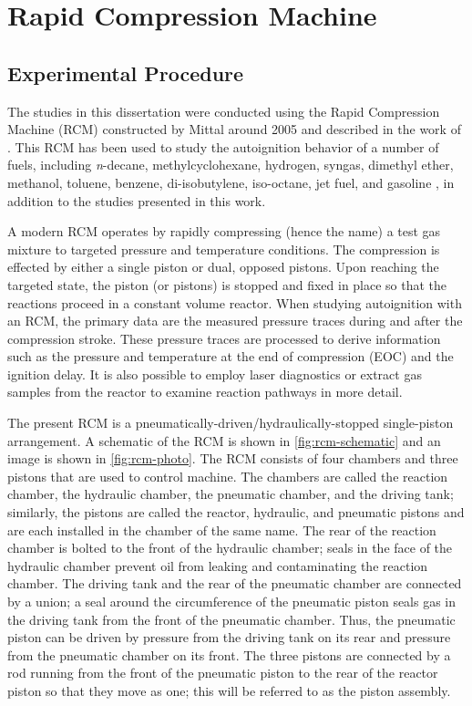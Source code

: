 \documentclass[../main.tex]{subfiles}
\begin{document}
\section{Rapid Compression Machine}
\label{sec:rcm}
\subsection{Experimental Procedure}
The studies in this dissertation were conducted using the Rapid
Compression Machine (RCM) constructed by Mittal around 2005 and described in the
work of \textcite{Mittal2007,Mittal2006a}. This RCM has been used to
study the autoignition behavior of a number of fuels, including
\textit{n}-decane, methylcyclohexane, hydrogen, syngas,
dimethyl ether, methanol, toluene, benzene, di-isobutylene, iso-octane,
jet fuel, and gasoline \cite{Kumar2009, Mittal2009, Das2012a, Mittal2006,
Das2012, Mittal2008a, Kumar2011a, Mittal2007a, Mittal2008, Kumar2010,
Dooley2010, Dooley2012, Hui2012a, Keromnes2013, Kukkadapu2013, Kukkadapu2012a},
in addition to the studies presented in this work.

A modern RCM operates by rapidly compressing (hence the name) a test gas
mixture to targeted pressure and temperature conditions. The compression
is effected by either a single piston or dual, opposed pistons. Upon
reaching the targeted state, the piston (or pistons) is stopped and
fixed in place so that the reactions proceed in a constant volume
reactor. When studying autoignition with an RCM, the primary data are
the measured pressure traces during and after the compression stroke.
These pressure traces are processed to derive information such as the
pressure and temperature at the end of compression (EOC) and the
ignition delay. It is also possible to employ laser diagnostics or
extract gas samples from the reactor to examine reaction pathways in
more detail.

The present RCM is a pneumatically-driven/hydraulically-stopped
single-piston arrangement. A schematic of the RCM is shown in
\autoref{fig:rcm-schematic} and an image is shown in \autoref{fig:rcm-photo}.
The RCM consists of four chambers and
three pistons that are used to control machine. The chambers are
called the reaction chamber, the hydraulic chamber, the pneumatic
chamber, and the driving tank; similarly, the pistons are called
the reactor, hydraulic, and pneumatic pistons and are each installed
in the chamber of the same name. The rear of the reaction chamber
is bolted to the front of the hydraulic chamber; seals in the face
of the hydraulic chamber prevent oil from leaking and contaminating
the reaction chamber. The driving tank and the rear of the pneumatic
chamber are connected by a union; a seal around the circumference of
the pneumatic piston seals gas in the driving tank from the front of
the pneumatic chamber. Thus, the pneumatic piston can be driven by
pressure from the driving tank on its rear and pressure from the
pneumatic chamber on its front. The three pistons are connected by
a rod running from the front of the pneumatic piston to the rear of
the reactor piston so that they move as one; this will be referred
to as the piston assembly.
\end{document}
